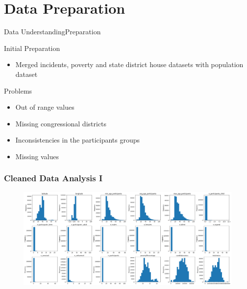 \section{Data Preparation}




\begin{frame}{Data Understanding\/Preparation}
    

    \begin{exampleblock}{Initial Preparation}
       
        \begin{itemize}
            \item Merged incidents, poverty and state district house datasets with population dataset
    
        \end{itemize}
        
    \end{exampleblock}


    \begin{exampleblock}{Problems}
        \begin{itemize}
            \item Out of range values
            \item Missing congressional districts
            \item Inconsistencies in the participants groups
            \item Missing values
        \end{itemize}
    
    \end{exampleblock}


\end{frame}





\begin{frame}
    \frametitle{Cleaned Data Analysis I}
    \begin{figure}
        \centering
        \includegraphics[width=.99\textwidth]{img/DU/dist.png}
        \label{corr}
    \end{figure}
\end{frame}


